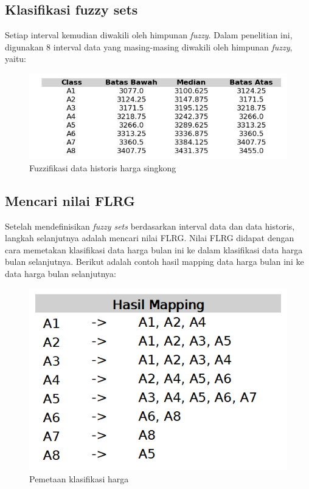 \documentclass[conference]{IEEEtran}
\begin{document}
\subsection{Klasifikasi fuzzy sets}
Setiap interval kemudian diwakili oleh himpunan \textit{fuzzy}. Dalam penelitian ini, digunakan 8 interval data yang masing-masing diwakili oleh himpunan \textit{fuzzy}, yaitu:
\begin{figure}[H]
    \centering
    \includegraphics[width=\columnwidth]{images/table.jpg} 
    \caption{Fuzzifikasi data historis harga singkong}
\end{figure}

\subsection{Mencari nilai FLRG}
Setelah mendefinisikan \textit{fuzzy sets} berdasarkan interval data dan data historis, langkah selanjutnya adalah mencari nilai FLRG. Nilai FLRG didapat dengan cara memetakan klasifikasi data harga bulan ini ke dalam klasifikasi data harga bulan selanjutnya. Berikut adalah contoh hasil mapping data harga bulan ini ke data harga bulan selanjutnya:

\begin{figure}[H]
    \centering
    \includegraphics[scale=0.4]{images/hasil_mapping.png} 
    \caption{Pemetaan klasifikasi harga}
\end{figure}
\end{document}
